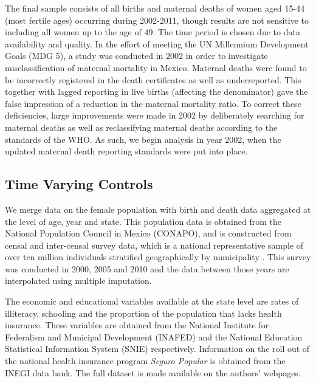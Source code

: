 \documentclass[a4paper, 11pt]{article}
\begin{document}
\begin{spacing}{1.4}
The final sample consists of all births and maternal deaths of women aged 15-44 (most
fertile ages) occurring during 2002-2011, though results are not sensitive to including
all women up to the age of 49. The time period is chosen due to data availability and
quality. In the effort of meeting the UN Millennium Development Goals (MDG 5), a study
was conducted in 2002 in order to investigate misclassification of maternal mortality in
Mexico. Maternal deaths were found to be incorrectly registered in the death certificates
as well as underreported. This together with lagged reporting in live births (affecting
the denominator) gave the false impression of a reduction in the maternal mortality
ratio. To correct these deficiencies, large improvements were made in 2002 by
deliberately searching for maternal deaths as well as reclassifying maternal deaths
according to the standards of the WHO. As such, we begin analysis in year 2002, when the
updated maternal death reporting standards were put into place.

\subsection{Time Varying Controls}
We merge data on the female population with birth and death data aggregated at the level
of age, year and state.  This population data is obtained from the National Population
Council in Mexico (CONAPO), and is constructed from censal and inter-censal survey data,
which is a national representative sample of over ten million individuals stratified
geographically by municipality \citep{CONAPO2012}. This survey was conducted in 2000,
2005 and 2010 and the data between those years are interpolated using multiple imputation.

The economic and educational variables available at the state level are rates of
illiteracy, schooling and the proportion of the population that lacks health insurance.
These variables are obtained from the National Institute for Federalism and Municipal
Development (INAFED) and the National Education Statistical Information System (SNIE)
respectively. Information on the roll out of the national health insurance program
\emph{Seguro Popular} is obtained from the INEGI data bank.  The full dataset is made
available on the authors' webpages.


\end{spacing}
\end{document}
